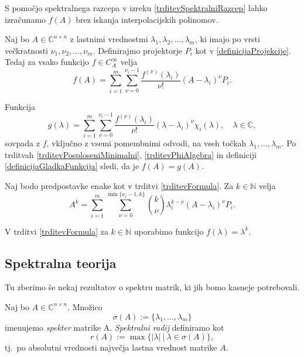 \documentclass[mat1]{fmfdelo}
\newcommand{\N}{\mathbb N}
\newcommand{\C}{\mathbb C}
\begin{document}
S pomočjo spektralnega razcepa v izreku \ref{trditevSpektralniRazcep} lahko izračunamo $f(A)$ brez iskanja interpolacijskih polinomov.
\begin{izrek} \label{trditevFormula}
    Naj bo $A \in \C^{n \times n}$ z lastnimi vrednostmi $\lambda_1, \lambda_2, \ldots, \lambda_m$, ki imajo po vrsti večkratnosti $\nu_1, \nu_2, \ldots, \nu_m$. Definirajmo projektorje $P_i$ kot v \eqref{definicijaProjekcije}. Tedaj za vsako funkcijo $f \in C_A^\infty$ velja
    \begin{equation*}
        f(A) = \sum_{i=1}^m \sum_{\nu = 0}^{\nu_i - 1} \frac{f^{(\nu)}(\lambda_i)}{\nu !}(A - \lambda_i)^\nu P_i.
    \end{equation*}
\end{izrek}
\begin{dokaz}
    Funkcija
    \begin{equation*}
        g(\lambda) = \sum_{i=1}^m \sum_{\nu = 0}^{\nu_i - 1} \frac{f^{(\nu)}(\lambda_i)}{\nu !}(\lambda - \lambda_i)^\nu \chi_i(\lambda), \quad \lambda \in \C,
    \end{equation*}
    sovpada z $f$, vključno z vsemi pomembnimi odvodi, na vseh točkah $\lambda_1, \ldots, \lambda_m$.  Po trditvah \ref{trditevPosploseniMinimalni}, \ref{trditevPhiAlgebra} in definiciji \ref{definicijaGladkaFunkcija} sledi, da je $f(A) = g(A)$.
\end{dokaz}
\begin{posledica}
    Naj bodo predpostavke enake kot v trditvi \ref{trditevFormula}. Za $k \in \N$ velja
    \begin{equation}\label{formulaMatricnePotence}
        A^k = \sum_{i=1}^m \sum_{\nu = 0}^{\min \{\nu_i - 1, k\}} {k \choose \nu} \lambda_i^{k-\nu}(A - \lambda_i)^\nu P_i.
    \end{equation}
\end{posledica}
\begin{dokaz}
    V trditvi \ref{trditevFormula} za $k \in \N$ uporabimo funkcijo $f(\lambda) = \lambda^k$.
\end{dokaz}

\subsection{Spektralna teorija}
Tu zberimo še nekaj rezultatov o spektru matrik, ki jih bomo kasneje potrebovali.
\begin{definicija}
    Naj bo $A \in \C^{n \times n}$. Množico
    \begin{equation*}
        \sigma(A) := \{\lambda_1, \ldots, \lambda_m\}
    \end{equation*}
    imenujemo \emph{spekter} matrike A. \emph{Spektralni radij} definiramo kot
    \begin{equation*}
        r(A) := \max \{|\lambda|\ |\ \lambda \in \sigma(A)\},
    \end{equation*}
    tj.\ po absolutni vrednosti največja lastna vrednost matrike $A$.
\end{definicija}
\end{document}
